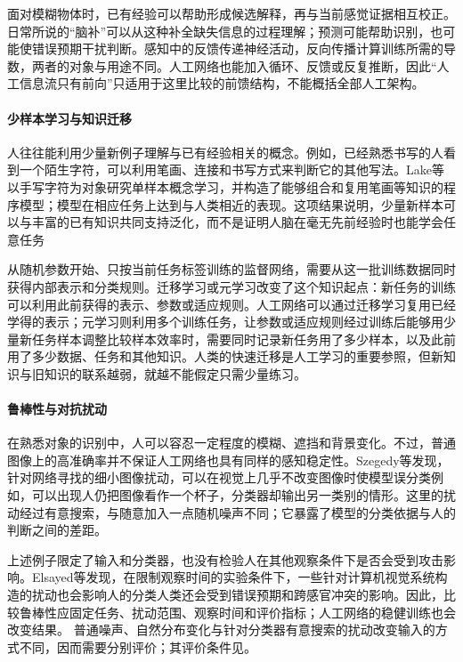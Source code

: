 面对模糊物体时，已有经验可以帮助形成候选解释，再与当前感觉证据相互校正。日常所说的“脑补”可以从这种补全缺失信息的过程理解；预测可能帮助识别，也可能使错误预期干扰判断。感知中的反馈传递神经活动，反向传播计算训练所需的导数，两者的对象与用途不同。人工网络也能加入循环、反馈或反复推断，因此“人工信息流只有前向”只适用于这里比较的前馈结构，不能概括全部人工架构。

\paragraph{少样本学习与知识迁移}
人往往能利用少量新例子理解与已有经验相关的概念。例如，已经熟悉书写的人看到一个陌生字符，可以利用笔画、连接和书写方式来判断它的其他写法。Lake等以手写字符为对象研究单样本概念学习，并构造了能够组合和复用笔画等知识的程序模型；模型在相应任务上达到与人类相近的表现。这项结果说明，少量新样本可以与丰富的已有知识共同支持泛化，而不是证明人脑在毫无先前经验时也能学会任意任务

从随机参数开始、只按当前任务标签训练的监督网络，需要从这一批训练数据同时获得内部表示和分类规则。迁移学习或元学习改变了这个知识起点：新任务的训练可以利用此前获得的表示、参数或适应规则。人工网络可以通过迁移学习复用已经学得的表示；元学习则利用多个训练任务，让参数或适应规则经过训练后能够用少量新任务样本调整比较样本效率时，需要同时记录新任务用了多少样本，以及此前用了多少数据、任务和其他知识。人类的快速迁移是人工学习的重要参照，但新知识与旧知识的联系越弱，就越不能假定只需少量练习。

\paragraph{鲁棒性与对抗扰动}
在熟悉对象的识别中，人可以容忍一定程度的模糊、遮挡和背景变化。不过，普通图像上的高准确率并不保证人工网络也具有同样的感知稳定性。Szegedy等发现，针对网络寻找的细小图像扰动，可以在视觉上几乎不改变图像时使模型误分类例如，可以出现人仍把图像看作一个杯子，分类器却输出另一类别的情形。这里的扰动经过有意搜索，与随意加入一点随机噪声不同；它暴露了模型的分类依据与人的判断之间的差距。

上述例子限定了输入和分类器，也没有检验人在其他观察条件下是否会受到攻击影响。Elsayed等发现，在限制观察时间的实验条件下，一些针对计算机视觉系统构造的扰动也会影响人的分类人类还会受到错误预期和跨感官冲突的影响。因此，比较鲁棒性应固定任务、扰动范围、观察时间和评价指标；人工网络的稳健训练也会改变结果。
普通噪声、自然分布变化与针对分类器有意搜索的扰动改变输入的方式不同，因而需要分别评价；其评价条件见。

